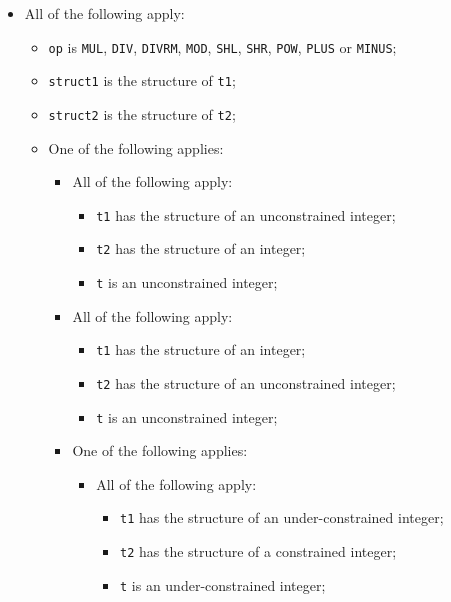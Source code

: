 \documentclass{book}
\begin{document}
\begin{itemize}
  \item All of the following apply:
    \begin{itemize}
    \item \texttt{op} is \texttt{MUL}, \texttt{DIV}, \texttt{DIVRM}, \texttt{MOD}, \texttt{SHL}, \texttt{SHR}, \texttt{POW}, \texttt{PLUS} or \texttt{MINUS};
    \item \texttt{struct1} is the structure of \texttt{t1};
    \item \texttt{struct2} is the structure of \texttt{t2};
    \item One of the following applies:
      \begin{itemize}
      \item All of the following apply:
        \begin{itemize}
        \item \texttt{t1} has the structure of an unconstrained integer;
        \item \texttt{t2} has the structure of an integer;
        \item \texttt{t} is an unconstrained integer;
        \end{itemize}
      \item All of the following apply:
        \begin{itemize}
        \item \texttt{t1} has the structure of an integer;
        \item \texttt{t2} has the structure of an unconstrained integer;
        \item \texttt{t} is an unconstrained integer;
        \end{itemize}
      \item One of the following applies: 
\begin{comment}    
ROMAN: I think the next two cases are subsumed by the case of two under/well-constrained integers.
\end{comment}
       \begin{itemize} 
       \item All of the following apply:
          \begin{itemize}
          \item \texttt{t1} has the structure of an under-constrained integer;
          \item \texttt{t2} has the structure of a constrained integer;
          \item \texttt{t} is an under-constrained integer;
          \end{itemize}

\end{itemize}
\end{itemize}
\end{itemize}
\end{itemize}
\end{document}
